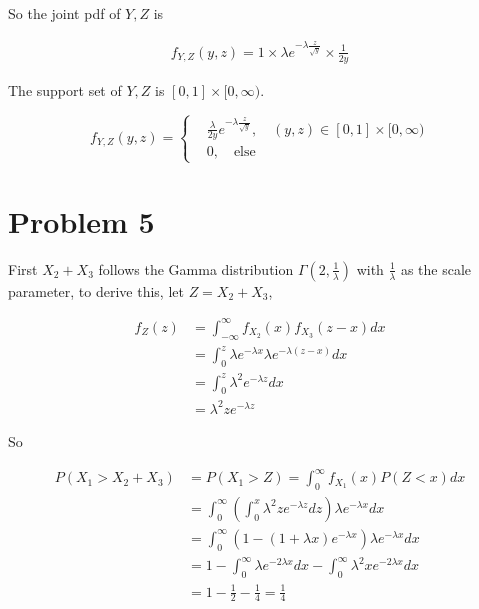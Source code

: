 \documentclass{article}
\begin{document}
So the joint pdf of $Y,Z$ is 

\begin{equation}
    \begin{aligned}
        f_{Y,Z}(y, z) = 1\times \lambda e^{-\lambda \frac z {\sqrt{y}}} \times \frac {1}{2y}
    \end{aligned}
\end{equation}

The support set of $Y,Z$ is $[0,1]\times [0,\infty)$.

\begin{equation}
    f_{Y,Z}(y, z) = \left\{\begin{aligned}
        &\frac {\lambda }{2y} e^{-\lambda \frac z {\sqrt{y}}}, \quad (y,z) \in [0,1]\times [0,\infty) \\
        &0,\quad \text{else}
    \end{aligned}\right.
\end{equation}

\section{Problem 5}

First $X_2+X_3$ follows the Gamma distribution $\Gamma(2,\frac{1}{\lambda})$ with $\frac{1}{\lambda}$ as the scale parameter, to derive this, let $Z = X_2+X_3$,

\begin{equation}
    \begin{aligned} f_{Z}(z) &=\int_{-\infty}^{\infty} f_{X_{2}}\left(x\right) f_{X_{3}}\left(z-x\right) d x 
    \\ &=\int_{0}^{z} \lambda e^{-\lambda x} \lambda  e^{-\lambda\left(z-x\right)} d x \\
    & =\int_{0}^{z} \lambda^2 e^{-\lambda z}  d x \\
& = \lambda^2 z e^{-\lambda z}\end{aligned}
\end{equation}


So

\begin{equation}
    \begin{aligned}
        P(X_1 > X_2+X_3) & = P(X_1 > Z) = \int_{0}^{\infty} f_{X_1}(x) P(Z<x)dx \\
        & = \int_{0}^{\infty}\left(\int_{0}^x \lambda^2 z e^{-\lambda z} dz \right) \lambda e^{-\lambda x} dx \\
        & =  \int_{0}^{\infty} \left(1-(1+\lambda x)e^{-\lambda x}\right) \lambda e^{-\lambda x} dx \\
        & = 1 - \int_{0}^{\infty} \lambda e^{-2\lambda x}dx - \int_{0}^{\infty} \lambda^2 x e^{-2\lambda x}dx \\
        & = 1 - \frac 1 2 - \frac{1}{4} = \frac 1 4 
    \end{aligned}
\end{equation}
\end{document}
